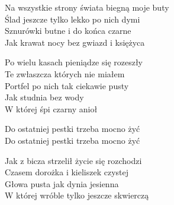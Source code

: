 \begin{text}
    Na wszystkie strony świata biegną moje buty\\
    Ślad jeszcze tylko lekko po nich dymi\\
    Sznurówki butne i do końca czarne\\
    Jak krawat nocy bez gwiazd i księżyca

    \vin Po wielu kasach pieniądze się rozeszły\\
    \vin Te zwłaszcza których nie miałem\\
    \vin Portfel po nich tak ciekawie pusty\\
    \vin Jak studnia bez wody\\
    \vin W której śpi czarny anioł

    \vin Do ostatniej pestki trzeba mocno żyć\\
    \vin Do ostatniej pestki trzeba mocno żyć

    Jak z bicza strzelił życie się rozchodzi\\
    Czasem dorożka i kieliszek czystej\\
    Głowa pusta jak dynia jesienna\\
    W której wróble tylko jeszcze skwierczą
\end{text}
\begin{chord}

\end{chord}